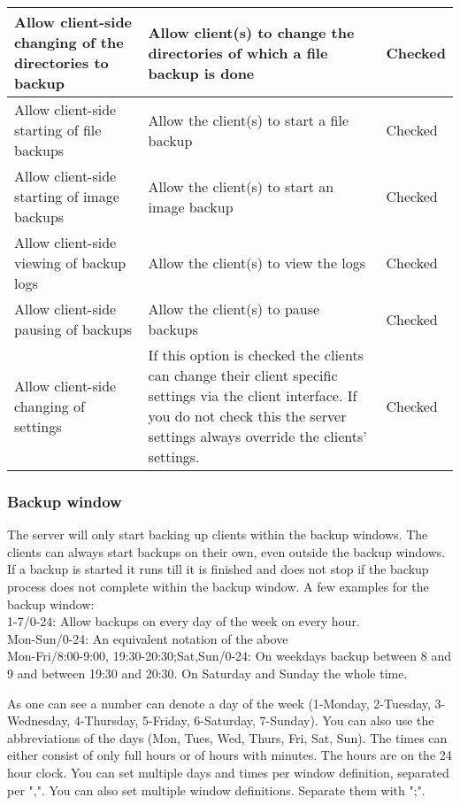 \documentclass[a4paper,10pt]{article} \usepackage[breaklinks=true]{hyperref}
\begin{document}
\begin{longtable}{|p{}|p{}|p{}|}
\hline
Allow client-side changing of the directories to backup & Allow client(s) to change the directories of which a file backup is done & Checked \\
\hline
Allow client-side starting of file backups & Allow the client(s) to start a file backup & Checked \\
\hline
Allow client-side starting of image backups & Allow the client(s) to start an image backup & Checked \\
\hline
Allow client-side viewing of backup logs & Allow the client(s) to view the logs & Checked \\
\hline
Allow client-side pausing of backups & Allow the client(s) to pause backups & Checked \\
\hline
Allow client-side changing of settings & If this option is checked the clients can change their client specific settings via the client interface. If you do not check this the server settings always override the clients' settings. & Checked\\
\hline
\end{longtable}

\subsubsection{Backup window}
\label{subsub_backup_window}

The server will only start backing up clients within the backup windows. The clients can always start backups on their own, even outside the backup windows. If a backup is started it runs till it is finished and does not stop if the backup process does not complete within the backup window. A few examples for the backup window:\\
1-7/0-24: Allow backups on every day of the week on every hour.\\
Mon-Sun/0-24: An equivalent notation of the above\\
Mon-Fri/8:00-9:00, 19:30-20:30;Sat,Sun/0-24: On weekdays backup between 8 and 9 and between 19:30 and 20:30. On Saturday and Sunday the whole time.

As one can see a number can denote a day of the week (1-Monday, 2-Tuesday, 3-Wednesday, 4-Thursday, 5-Friday, 6-Saturday, 7-Sunday). You can also use the abbreviations of the days (Mon, Tues, Wed, Thurs, Fri, Sat, Sun). The times can either consist of only full hours or of hours with minutes. The hours are on the 24 hour clock. You can set multiple days and times per window definition, separated per ",". You can also set multiple window definitions. Separate them with ";".
\end{document}
